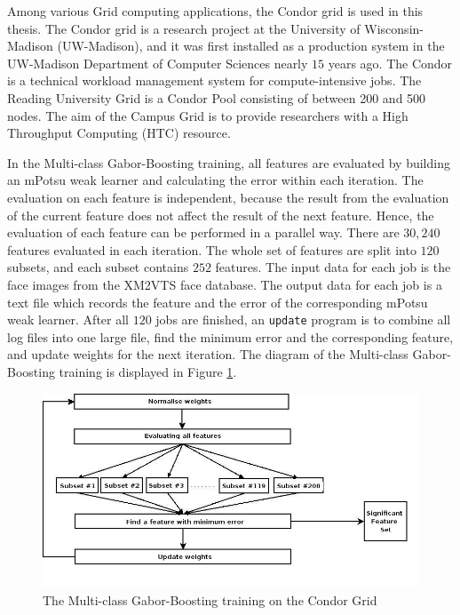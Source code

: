 Among various Grid computing applications, the Condor grid \cite{Thain2002} is used in this thesis. The Condor grid is a research project at the University of Wisconsin-Madison (UW-Madison), and it was first installed as a production system in the UW-Madison Department of Computer Sciences nearly $15$ years ago. The Condor is a technical workload management system for compute-intensive jobs. The Reading University Grid is a Condor Pool consisting of between 200 and 500 nodes. The aim of the Campus Grid is to provide researchers with a High Throughput Computing (HTC) resource.

In the Multi-class Gabor-Boosting training, all features are evaluated by building an mPotsu weak learner and calculating the error within each iteration. The evaluation on each feature is independent, because the result from the evaluation of the current feature does not affect the result of the next feature. Hence, the evaluation of each feature can be performed in a parallel way. There are $30,240$ features evaluated in each iteration. The whole set of features are split into $120$ subsets, and each subset contains $252$ features. The input data for each job is the face images from the \mbox{XM2VTS} face database. The output data for each job is a text file which records the feature and the error of the corresponding mPotsu weak learner. After all $120$ jobs are finished, an \verb|update| program is to combine all log files into one large file, find the minimum error and the corresponding feature, and update weights for the next iteration. The diagram of the Multi-class Gabor-Boosting training is displayed in \mbox{Figure} \ref{fig:mutliclasscondor}.
\begin{figure}[ht]
 \includegraphics[width=\columnwidth]{ch5/figures/MultiCondor.jpg}
\caption{The  Multi-class Gabor-Boosting training on the Condor Grid}
\label{fig:mutliclasscondor}
\end{figure} 

